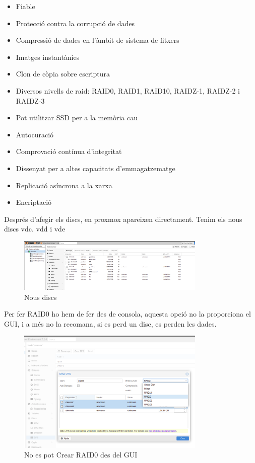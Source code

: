 \documentclass[
  10pt,
]{krantz}
\begin{document}
\begin{itemize}
\item
  Fiable
\item
  Protecció contra la corrupció de dades
\item
  Compressió de dades en l'àmbit de sistema de fitxers
\item
  Imatges instantànies
\item
  Clon de còpia sobre escriptura
\item
  Diversos nivells de raid: RAID0, RAID1, RAID10, RAIDZ-1, RAIDZ-2 i RAIDZ-3
\item
  Pot utilitzar SSD per a la memòria cau
\item
  Autocuració
\item
  Comprovació contínua d'integritat
\item
  Dissenyat per a altes capacitats d'emmagatzematge
\item
  Replicació asíncrona a la xarxa
\item
  Encriptació
\end{itemize}

Després d'afegir els discs, en proxmox apareixen directament. Tenim els nous discs vdc. vdd i vde

\begin{figure}
\centering
\includegraphics[width=0.8\textwidth,height=\textheight]{imatges/proxmox/prox_disc.png}
\caption{Nous discs}
\end{figure}

Per fer RAID0 ho hem de fer des de consola, aquesta opció no la proporciona el GUI, i a més no la recomana, si es perd un disc, es perden les dades.

\begin{figure}
\centering
\includegraphics[width=0.8\textwidth,height=\textheight]{imatges/proxmox/prox_disc_no0.png}
\caption{No es pot Crear RAID0 des del GUI}
\end{figure}
\end{document}
